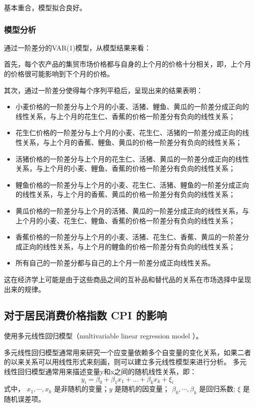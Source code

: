 \documentclass[a4paper,AutoFakeBold,AutoFakeSlant]{ctexart}
\begin{document}
基本重合，模型拟合良好。

\subsubsection{模型分析}
通过一阶差分的VAR(1)模型，从模型结果来看：

首先，每个农产品的集贸市场价格都与自身的上个月的价格十分相关，即，上个月的价格很可能影响到下个月的价格。

其次，通过一阶差分使得每个序列平稳后，呈现出来的结果表明：
\begin{itemize}
  \item 小麦价格的一阶差分与上个月的小麦、活猪、鲤鱼、黄瓜的一阶差分成正向的线性关系，与上个月的花生仁、香蕉的价格一阶差分有负向的线性关系；
  \item 花生仁价格的一阶差分与上个月的小麦、花生仁、活猪的一阶差分成正向的线性关系，与上个月的香蕉、鲤鱼、黄瓜的价格一阶差分有负向的线性关系；
  \item 活猪价格的一阶差分与上个月的花生仁、活猪、黄瓜的一阶差分成正向的线性关系，与上个月的小麦、鲤鱼、香蕉的价格一阶差分有负向的线性关系；
  \item 鲤鱼价格的一阶差分与上个月的小麦、花生仁、活猪、鲤鱼的一阶差分成正向的线性关系，与上个月的香蕉、黄瓜的价格一阶差分有负向的线性关系；
  \item 黄瓜价格的一阶差分与上个月的活猪、黄瓜的一阶差分成正向的线性关系，与上个月的小麦、花生仁、鲤鱼、香蕉的价格一阶差分有负向的线性关系；
  \item 香蕉价格的一阶差分与上个月的小麦、活猪、花生仁、香蕉、黄瓜的一阶差分成正向的线性关系，与上个月的鲤鱼的价格一阶差分有负向的线性关系；
  \item 所有自己的一阶差分都与自己的上个月一阶差分成正向线性关系。
\end{itemize}

这在经济学上可能是由于这些商品之间的互补品和替代品的关系在市场选择中呈现出来的规律。

\subsection{对于居民消费价格指数 CPI 的影响}
使用多元线性回归模型（multivariable linear regression model ）。

多元线性回归模型通常用来研究一个应变量依赖多个自变量的变化关系，如果二者的以来关系可以用线性形式来刻画，则可以建立多元线性模型来进行分析。
多元线性回归模型通常用来描述变量y和x之间的随机线性关系，即：
\begin{equation}
y_i=\beta_{0}+\beta_{1} x_{1}+\ldots+\beta_{k} x_{k}+\xi_i
\end{equation}
式中，  $x_{1}, \cdots, x_{k}$  是非随机的变量；$y$ 是随机的因变量；  $\beta_{0}, \cdots, \beta_{k}$  是回归系数;  $\xi$  是随机误差项。
\end{document}
